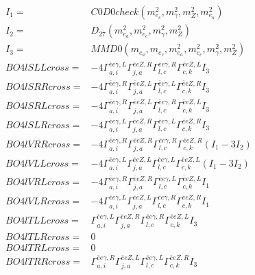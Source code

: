 \documentclass[A4,landscape]{article}
\begin{document}
\begin{align} 
I_1 = & C0D0check(m^2_{e_{{c}}}, m^2_{\gamma}, m^2_{Z}, m^2_{e_{{a}}}) \\ 
I_2 = & D_{27}(m^2_{e_{{a}}}, m^2_{e_{{c}}}, m^2_{\gamma}, m^2_{Z}) \\ 
I_3 = & MMD0(m_{e_{{a}}}, m_{e_{{c}}}, m^2_{e_{{a}}}, m^2_{e_{{c}}}, m^2_{\gamma}, m^2_{Z}) \\ 
  BO4lSLLcross= & -4  \Gamma^{\bar{e}e \gamma ,L}_{a, i} \Gamma^{\bar{e}e Z ,R}_{j, a} \Gamma^{\bar{e}e \gamma ,R}_{l, c} \Gamma^{\bar{e}e Z ,L}_{c, k} I_3 \\ 
  BO4lSRRcross= & -4  \Gamma^{\bar{e}e \gamma ,R}_{a, i} \Gamma^{\bar{e}e Z ,L}_{j, a} \Gamma^{\bar{e}e \gamma ,L}_{l, c} \Gamma^{\bar{e}e Z ,R}_{c, k} I_3 \\ 
  BO4lSRLcross= & -4  \Gamma^{\bar{e}e \gamma ,R}_{a, i} \Gamma^{\bar{e}e Z ,L}_{j, a} \Gamma^{\bar{e}e \gamma ,R}_{l, c} \Gamma^{\bar{e}e Z ,L}_{c, k} I_3 \\ 
  BO4lSLRcross= & -4  \Gamma^{\bar{e}e \gamma ,L}_{a, i} \Gamma^{\bar{e}e Z ,R}_{j, a} \Gamma^{\bar{e}e \gamma ,L}_{l, c} \Gamma^{\bar{e}e Z ,R}_{c, k} I_3 \\ 
  BO4lVRRcross= & -4  \Gamma^{\bar{e}e \gamma ,R}_{a, i} \Gamma^{\bar{e}e Z ,R}_{j, a} \Gamma^{\bar{e}e \gamma ,R}_{l, c} \Gamma^{\bar{e}e Z ,R}_{c, k} (I_1 - 3 I_2) \\ 
  BO4lVLLcross= & -4  \Gamma^{\bar{e}e \gamma ,L}_{a, i} \Gamma^{\bar{e}e Z ,L}_{j, a} \Gamma^{\bar{e}e \gamma ,L}_{l, c} \Gamma^{\bar{e}e Z ,L}_{c, k} (I_1 - 3 I_2) \\ 
  BO4lVRLcross= & -4  \Gamma^{\bar{e}e \gamma ,R}_{a, i} \Gamma^{\bar{e}e Z ,R}_{j, a} \Gamma^{\bar{e}e \gamma ,L}_{l, c} \Gamma^{\bar{e}e Z ,L}_{c, k} I_1 \\ 
  BO4lVLRcross= & -4  \Gamma^{\bar{e}e \gamma ,L}_{a, i} \Gamma^{\bar{e}e Z ,L}_{j, a} \Gamma^{\bar{e}e \gamma ,R}_{l, c} \Gamma^{\bar{e}e Z ,R}_{c, k} I_1 \\ 
  BO4lTLLcross= &  \Gamma^{\bar{e}e \gamma ,L}_{a, i} \Gamma^{\bar{e}e Z ,R}_{j, a} \Gamma^{\bar{e}e \gamma ,R}_{l, c} \Gamma^{\bar{e}e Z ,L}_{c, k} I_3 \\ 
  BO4lTLRcross= & 0 \\ 
  BO4lTRLcross= & 0 \\ 
  BO4lTRRcross= &  \Gamma^{\bar{e}e \gamma ,R}_{a, i} \Gamma^{\bar{e}e Z ,L}_{j, a} \Gamma^{\bar{e}e \gamma ,L}_{l, c} \Gamma^{\bar{e}e Z ,R}_{c, k} I_3 \\ 
\end{align} 
\end{document}

